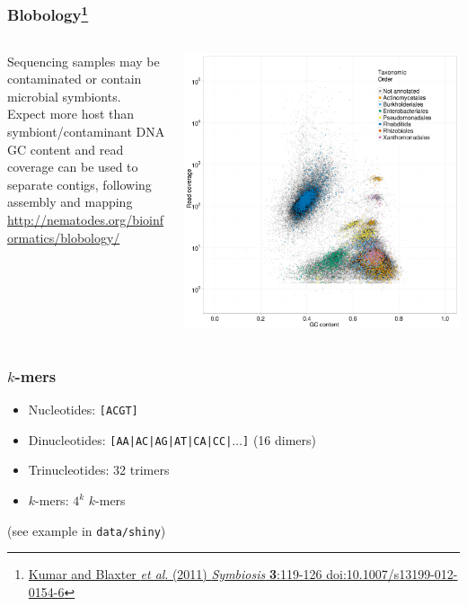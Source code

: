 \begin{frame}
  \frametitle{Blobology\footnote{\tiny{\href{http://dx.doi.org/10.1007/s13199-012-0154-6}{Kumar and Blaxter \textit{et al}. (2011) \textit{Symbiosis} \textbf{3}:119-126 doi:10.1007/s13199-012-0154-6}}}}
  \begin{columns}[T]
    \begin{column}{5cm}
      Sequencing samples may be contaminated or contain microbial symbionts.\\
      Expect more host than symbiont/contaminant DNA\\
      GC content and read coverage can be used to separate contigs, following assembly and mapping\\
      \href{http://nematodes.org/bioinformatics/blobology/}{http://nematodes.org/bioinformatics/blobology/}
    \end{column}
    \begin{column}{5cm}
      \includegraphics[width=1\textwidth]{images/blobology}
    \end{column}
  \end{columns}
\end{frame}

\begin{frame}
  \frametitle{$k$-mers}
     \begin{itemize}
       \item Nucleotides: \texttt{[ACGT]}
       \item Dinucleotides: \texttt{[AA|AC|AG|AT|CA|CC|$\ldots$]} (16 dimers)
       \item Trinucleotides: 32 trimers
       \item $k$-mers: $4^k$ $k$-mers
     \end{itemize}
     (see example in \texttt{data/shiny})
\end{frame}

